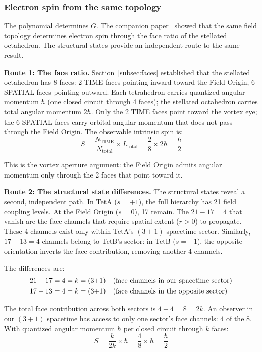 \documentclass[aps,prd,preprint,superscriptaddress,showpacs,preprintnumbers,amsmath,amssymb,nofootinbib]{revtex4-2}
\begin{document}
\subsubsection*{Electron spin from the same topology}

The polynomial determines $G$. The companion paper~\cite{paper6} showed that the same field topology determines electron spin through the face ratio of the stellated octahedron. The structural states provide an independent route to the same result.

\textbf{Route 1: The face ratio.} Section~\ref{subsec:faces} established that the stellated octahedron has 8 faces: 2 TIME faces pointing inward toward the Field Origin, 6 SPATIAL faces pointing outward. Each tetrahedron carries quantized angular momentum $\hbar$ (one closed circuit through 4 faces); the stellated octahedron carries total angular momentum $2\hbar$. Only the 2 TIME faces point toward the vortex eye; the 6 SPATIAL faces carry orbital angular momentum that does not pass through the Field Origin. The observable intrinsic spin is:
\begin{equation}
S = \frac{N_{\text{TIME}}}{N_{\text{total}}} \times L_{\text{total}} = \frac{2}{8} \times 2\hbar = \frac{\hbar}{2}
\label{eq:spin}
\end{equation}

This is the vortex aperture argument: the Field Origin admits angular momentum only through the 2 faces that point toward it.

\textbf{Route 2: The structural state differences.} The structural states reveal a second, independent path. In TetA ($s = +1$), the full hierarchy has 21 field coupling levels. At the Field Origin ($s = 0$), 17 remain. The $21 - 17 = 4$ that vanish are the face channels that require spatial extent ($r > 0$) to propagate. These 4 channels exist only within TetA's $(3+1)$ spacetime sector. Similarly, $17 - 13 = 4$ channels belong to TetB's sector: in TetB ($s = -1$), the opposite orientation inverts the face contribution, removing another 4 channels.

The differences are:
\begin{align}
21 - 17 &= 4 = k = (3{+}1) \quad \text{(face channels in our spacetime sector)} \notag \\
17 - 13 &= 4 = k = (3{+}1) \quad \text{(face channels in the opposite sector)} \notag
\end{align}

The total face contribution across both sectors is $4 + 4 = 8 = 2k$. An observer in our $(3+1)$ spacetime has access to only one sector's face channels: 4 of the 8. With quantized angular momentum $\hbar$ per closed circuit through $k$ faces:
\begin{equation}
S = \frac{k}{2k} \times \hbar = \frac{4}{8} \times \hbar = \frac{\hbar}{2}
\label{eq:spin-route2}
\end{equation}
\end{document}
